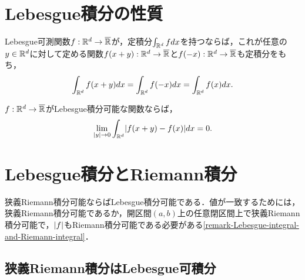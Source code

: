\documentclass[uplatex, dvipdfmx]{jsreport}
\begin{document}
\section{Lebesgue積分の性質}

\begin{theorem}[平行移動不変性]\label{thm-invariance-of-Lebesgue-integral}
    Lebesgue可測関数$f:\mathbb{R}^d\to\overline{\mathbb{R}}$が，定積分$\int_{\mathbb{R}^d}fdx$を持つならば，これが任意の$y\in\mathbb{R}^d$に対して定める関数$f(x+y):\mathbb{R}^d\to\overline{\mathbb{R}}$と$f(-x):\mathbb{R}^d\to\overline{\mathbb{R}}$も定積分をもち，
    \[\int_{\mathbb{R}^d}f(x+y)dx=\int_{\mathbb{R}^d}f(-x)dx=\int_{\mathbb{R}^d}f(x)dx.\]
\end{theorem}

\begin{theorem}
    $f:\mathbb{R}^d\to\overline{\mathbb{R}}$がLebesgue積分可能な関数ならば，
    \[\lim_{\lvert y\rvert\to 0}\int_{\mathbb{R}^d}\lvert f(x+y)-f(x)\rvert dx=0.\]
\end{theorem}

\section{Lebesgue積分とRiemann積分}

\begin{tcolorbox}[colframe=ForestGreen, colback=ForestGreen!10!white,breakable,colbacktitle=ForestGreen!40!white,coltitle=black,fonttitle=\bfseries\sffamily,
title=]
    狭義Riemann積分可能ならばLebesgue積分可能である．値が一致するためには，狭義Riemann積分可能であるか，開区間$(a,b)$上の任意閉区間上で狭義Riemann積分可能で，$\lvert f\rvert$もRiemann積分可能である必要がある\ref{remark-Lebesgue-integral-and-Riemann-integral}．
\end{tcolorbox}

\subsection{狭義Riemann積分はLebesgue可積分}
\end{document}
